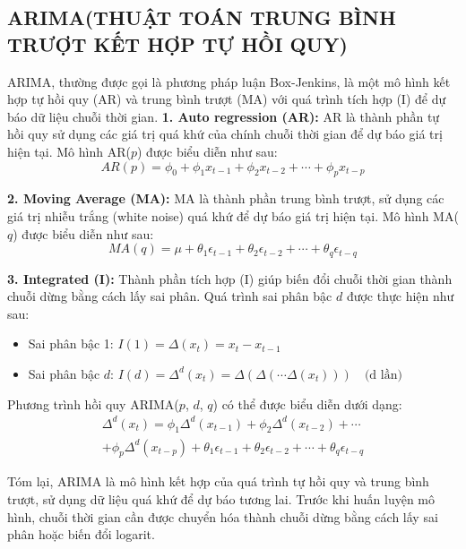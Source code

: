 \documentclass[conference]{IEEEtran}
\begin{document}
	\subsection{ARIMA(THUẬT TOÁN TRUNG BÌNH TRƯỢT KẾT HỢP TỰ HỒI QUY)}
	ARIMA, thường được gọi là phương pháp luận Box-Jenkins, là một mô hình kết hợp tự hồi quy (AR) và trung bình trượt (MA) với quá trình tích hợp (I) để dự báo dữ liệu chuỗi thời gian. 
	\textbf{1. Auto regression (AR):} 
	AR là thành phần tự hồi quy sử dụng các giá trị quá khứ của chính chuỗi thời gian để dự báo giá trị hiện tại. Mô hình AR($p$) được biểu diễn như sau:
	\begin{equation}
		AR(p) = \phi_0 + \phi_1 x_{t-1} + \phi_2 x_{t-2} + \cdots + \phi_p x_{t-p}
	\end{equation}
	
	\textbf{2. Moving Average (MA):}
	MA là thành phần trung bình trượt, sử dụng các giá trị nhiễu trắng (white noise) quá khứ để dự báo giá trị hiện tại. Mô hình MA($q$) được biểu diễn như sau:
	\begin{equation}
		MA(q) = \mu + \theta_1 \epsilon_{t-1} + \theta_2 \epsilon_{t-2} + \cdots + \theta_q \epsilon_{t-q}
	\end{equation}
	
	\textbf{3. Integrated (I):}
	Thành phần tích hợp (I) giúp biến đổi chuỗi thời gian thành chuỗi dừng bằng cách lấy sai phân. Quá trình sai phân bậc $d$ được thực hiện như sau:
	\begin{itemize}
		\item Sai phân bậc 1: $I(1) = \Delta(x_t) = x_t - x_{t-1}$
		\item Sai phân bậc $d$: $I(d) = \Delta^d(x_t) = \Delta(\Delta(\cdots \Delta(x_t))) \quad \text{(d lần)}$
	\end{itemize}
	
	Phương trình hồi quy ARIMA($p$, $d$, $q$) có thể được biểu diễn dưới dạng:
	\begin{multline}
		\Delta^d(x_t) = \phi_1 \Delta^d(x_{t-1}) + \phi_2 \Delta^d(x_{t-2}) + \cdots \\
		+ \phi_p \Delta^d(x_{t-p}) + \theta_1 \epsilon_{t-1} + \theta_2 \epsilon_{t-2} + \cdots + \theta_q \epsilon_{t-q}
	\end{multline}
	
	
	Tóm lại, ARIMA là mô hình kết hợp của quá trình tự hồi quy và trung bình trượt, sử dụng dữ liệu quá khứ để dự báo tương lai. Trước khi huấn luyện mô hình, chuỗi thời gian cần được chuyển hóa thành chuỗi dừng bằng cách lấy sai phân hoặc biến đổi logarit.
	
\end{document}
